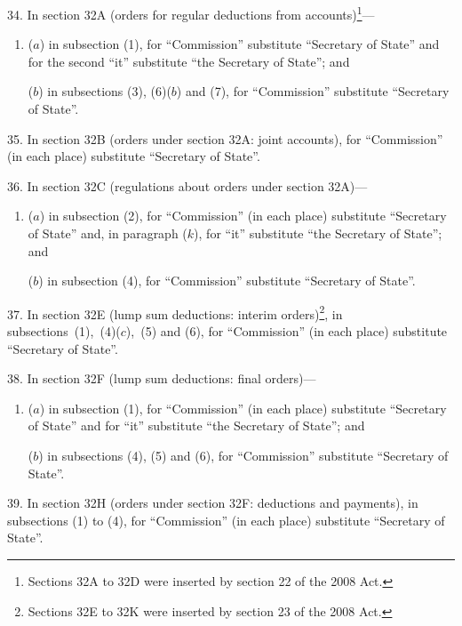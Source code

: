 \documentclass[12pt,a4paper]{article}
\begin{document}
34.  In section 32A (orders for regular deductions from accounts)\footnote{Sections 32A to 32D were inserted by section 22 of the 2008 Act.}—
\begin{enumerate}\item[]
($a$) in subsection (1), for “Commission” substitute “Secretary of State” and for the second “it” substitute “the Secretary of State”; and

($b$) in subsections (3), (6)($b$)  and (7), for “Commission” substitute “Secretary of State”.
\end{enumerate}

\medskip

35.  In section 32B (orders under section 32A: joint accounts), for “Commission” (in each place) substitute “Secretary of State”.

\medskip

36.  In section 32C (regulations about orders under section 32A)—
\begin{enumerate}\item[]
($a$) in subsection (2), for “Commission” (in each place) substitute “Secretary of State” and, in paragraph ($k$), for “it” substitute “the Secretary of State”; and

($b$) in subsection (4), for “Commission” substitute “Secretary of State”.
\end{enumerate}

\medskip

\begin{sloppypar}
37.  In section 32E (lump sum deductions: interim orders)\footnote{Sections 32E to 32K were inserted by section 23 of the 2008 Act.}, in subsections~(1),~(4)($c$),~(5) and (6), for “Commission” (in each place) substitute “Secretary of State”.
\end{sloppypar}

\medskip

38.  In section 32F (lump sum deductions: final orders)—
\begin{enumerate}\item[]
($a$) in subsection (1), for “Commission” (in each place) substitute “Secretary of State” and for “it” substitute “the Secretary of State”; and

($b$) in subsections (4), (5) and (6), for “Commission” substitute “Secretary of State”.
\end{enumerate}

\medskip

39.  In section 32H (orders under section 32F: deductions and payments), in subsections (1) to (4), for “Commission” (in each place) substitute “Secretary of State”.
\end{document}
